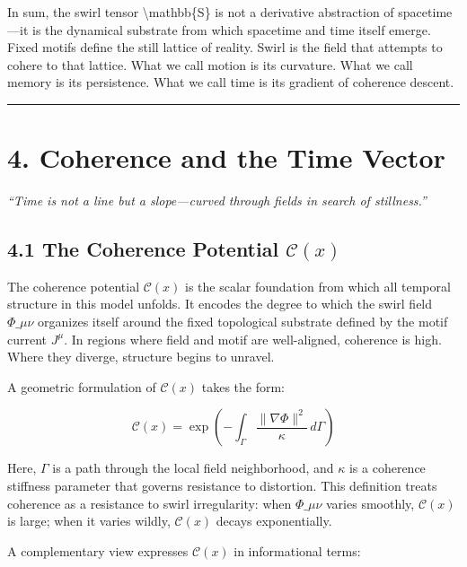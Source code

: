 \documentclass[
  11pt,
]{article}
\begin{document}
In sum, the swirl tensor \textbackslash mathbb\{S\} is not a derivative
abstraction of spacetime---it is the dynamical substrate from which
spacetime and time itself emerge. Fixed motifs define the still lattice
of reality. Swirl is the field that attempts to cohere to that lattice.
What we call motion is its curvature. What we call memory is its
persistence. What we call time is its gradient of coherence descent.

\begin{center}\rule{0.5\linewidth}{0.5pt}\end{center}

\section{4. Coherence and the Time
Vector}\label{coherence-and-the-time-vector}

\emph{``Time is not a line but a slope---curved through fields in search
of stillness.''}

\subsection{\texorpdfstring{4.1 The Coherence Potential
\(\mathcal{C}(x)\)}{4.1 The Coherence Potential \textbackslash mathcal\{C\}(x)}}\label{the-coherence-potential-mathcalcx}

The coherence potential \(\mathcal{C}(x)\) is the scalar foundation from
which all temporal structure in this model unfolds. It encodes the
degree to which the swirl field \(\Phi\_{\mu\nu}\) organizes itself
around the fixed topological substrate defined by the motif current
\(J^\mu\). In regions where field and motif are well-aligned, coherence
is high. Where they diverge, structure begins to unravel.

A geometric formulation of \(\mathcal{C}(x)\) takes the form:

\[
\mathcal{C}(x) = \exp\left( -\int_\Gamma \frac{\|\nabla \Phi\|^2}{\kappa} \, d\Gamma \right)
\]

Here, \(\Gamma\) is a path through the local field neighborhood, and
\(\kappa\) is a coherence stiffness parameter that governs resistance to
distortion. This definition treats coherence as a resistance to swirl
irregularity: when \(\Phi\_{\mu\nu}\) varies smoothly,
\(\mathcal{C}(x)\) is large; when it varies wildly, \(\mathcal{C}(x)\)
decays exponentially.

A complementary view expresses \(\mathcal{C}(x)\) in informational
terms:
\end{document}
